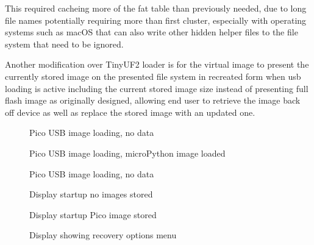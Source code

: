 This required cacheing more of the \gls{fat} table than previously needed, due to long file names potentially requiring more than first cluster, especially with operating systems such as macOS that can also write other hidden helper files to the file system that need to be ignored.

Another modification over TinyUF2 loader is for the virtual image to present the currently stored image on the presented file system in recreated form when \gls{usb} loading is active including the current stored image size instead of presenting full flash image as originally designed, allowing end user to retrieve the image back off device as well as replace the stored image with an updated one.

\pagebreak
\begin{figure}[ht]
	\centering
	\caption{Pico USB image loading, no data}
	\label{fig:picousbnodata}
\end{figure}

\begin{figure}[ht]
	\centering
	\caption{Pico USB image loading, microPython image loaded}
	\label{fig:picousbdata}
\end{figure}

\begin{figure}[ht]
	\centering
	\caption{Pico USB image loading, no data}
	\label{fig:usb_nodata_picow}
\end{figure}

\begin{figure}[ht]
	\centering
	\caption{Display startup no images stored}
	\label{fig:disp_startup_empty}
\end{figure}

\begin{figure}[ht]
	\centering
	\caption{Display startup Pico image stored}
	\label{fig:disp_startup_pico}
\end{figure}

\begin{figure}[ht]
	\centering
	\caption{Display showing recovery options menu}
	\label{fig:disp_menu}
\end{figure}

